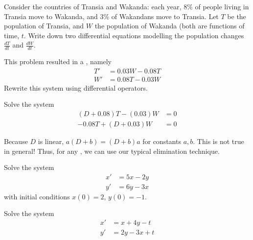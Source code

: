 \begin{applicationActivities}

\begin{activity}{10}
Consider the countries of Transia and Wakanda: each year, \(8\%\) of people living in Transia move to Wakanda, and \(3\%\) of Wakandans move to Transia.
\vfill
Let \(T\) be the population of Transia, and \(W\) the population of Wakanda (both are functions of time, \(t\).
\vfill
Write down two differential equations modelling the population changes \(\frac{dT}{dt}\) and \(\frac{dW}{dt}\).
\end{activity}

\begin{activity}{5}
This problem resulted in a , namely
\vfill
\begin{alignat*}{2}
T' &= 0.03W-0.08T \\
W' &= 0.08T-0.03W
\end{alignat*}
\vfill
Rewrite this system using differential operators.
\end{activity}

\begin{activity}{15}
Solve the system
\begin{alignat*}{2}
(D+0.08)T-(0.03)W &= 0 \\
-0.08T + (D+0.03)W &= 0 
\end{alignat*}
\end{activity}

\begin{observation}
Because \(D\) is linear, \(a(D+b)=(D+b)a\) for constants \(a,b\).  This is not true in general!
\vfill
Thus, for any , we can use our typical elimination technique.
\end{observation}

\begin{activity}{15}
Solve the system
\begin{alignat*}{2}
x'&=5x-2y \\
y'&=6y-3x
\end{alignat*}
with initial conditions \(x(0)=2\), \(y(0)=-1\).
\end{activity}


\begin{activity}{10}
Solve the system
\begin{alignat*}{2}
x'&=x+4y-t \\
y'&=2y-3x+t
\end{alignat*}
\end{activity}

\end{applicationActivities}
